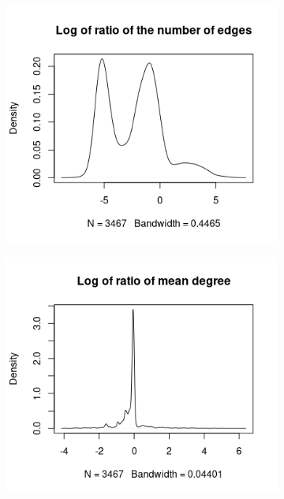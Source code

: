 \documentclass{l4proj}
\theoremstyle{definition}
\theoremstyle{remark}
\begin{document}
\begin{figure}
  \centering
  \begin{subfigure}[t]{0.49\textwidth}
    \centering
    \includegraphics[width=\textwidth]{images/sip_ratio_edges.png}
  \end{subfigure}
  \begin{subfigure}[t]{0.49\textwidth}
    \centering
    \includegraphics[width=\textwidth]{images/sip_ratio_meandeg.png}
  \end{subfigure}

\end{figure}
\end{document}
